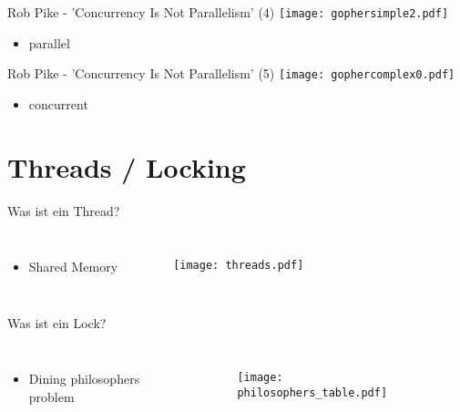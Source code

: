 \documentclass[compress]{beamer}
\begin{document}
  \begin{frame}{Rob Pike - 'Concurrency Is Not Parallelism' (4)}
    \texttt{[image: gophersimple2.pdf]}
    \begin{itemize}
      \item parallel
    \end{itemize}
  \end{frame}

  \begin{frame}{Rob Pike - 'Concurrency Is Not Parallelism' (5)}
    \texttt{[image: gophercomplex0.pdf]}
    \begin{itemize}
      \item concurrent
    \end{itemize}
  \end{frame}

\section{Threads / Locking}
  \begin{frame}{Was ist ein Thread?}
    \begin{columns}[c]
      \begin{itemize}
        \item Shared Memory
      \end{itemize}
      \begin{figure}
        \centering
        \texttt{[image: threads.pdf]}
      \end{figure}
    \end{columns}
  \end{frame}
  
  \begin{frame}{Was ist ein Lock?}
    \begin{columns}[c]
      \begin{itemize}
      \item{Dining philosophers problem}
      \end{itemize}
      \begin{figure}
        \centering
        \texttt{[image: philosophers\_table.pdf]}
      \end{figure}
    \end{columns}
  \end{frame}
\end{document}
